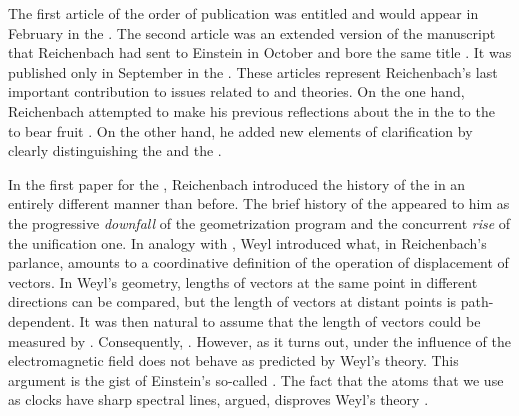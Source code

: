 \documentclass[draft]{article}
\newcommand{\PRZL}{\citetitle{Reichenbach1928}\xspace}
\begin{document}
The first article of the order of publication was entitled  \citep{Reichenbach1929b} and would appear in February in the . The second article was an extended version of the manuscript that Reichenbach had sent to Einstein in October and bore the same title  \citep{Reichenbach1929a}. It was published only in September in the . These articles represent Reichenbach's last important contribution to issues related to \rt and \spti theories. On the one hand, Reichenbach attempted to make his previous reflections about the \uftp in the \Ap to the \PRZL to bear fruit \citep[\S46]{Reichenbach1928}. On the other hand, he added new elements of clarification by clearly distinguishing the  and the .


In the first paper for the , Reichenbach introduced the history of the \uft in an entirely different manner than before. The brief history of the \uftp appeared to him as the progressive \emph{downfall} of the geometrization program and the concurrent \emph{rise} of the unification one.  In analogy with \gr, Weyl introduced what, in Reichenbach's parlance, amounts to a coordinative definition of the operation of displacement of vectors. In Weyl's geometry, \spti lengths of vectors at the same point in different directions can be compared, but the length of vectors at distant points is path-dependent. It was then natural to assume that the length of vectors could be measured by \rac. Consequently,  \citep[122]{Reichenbach1929b}. However, as it turns out, \rac under the influence of the electromagnetic field does not behave as predicted by Weyl's theory. This argument is the gist of Einstein's so-called . The fact that the atoms that we use as clocks have sharp spectral lines, \citet{Einstein1918b} argued, disproves Weyl's theory \citep[see][\S4.2.4]{Ryckman2005}. 
\end{document}

